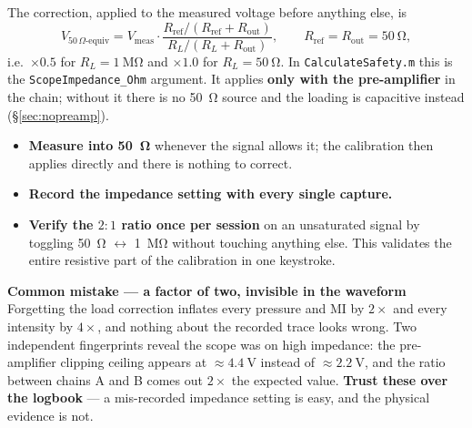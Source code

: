 \documentclass[11pt,a4paper]{article}
\newcommand{\good}[1]{\textcolor{green!45!black}{\textbf{#1}}}
\newcommand{\mistaketitle}[1]{\textcolor{orange!75!black}{\textbf{Common mistake --- #1}}\\[2pt]}
\begin{document}
The correction, applied to the measured voltage before anything else, is
\begin{equation}
  V_{50\,\Omega\text{-equiv}} = V_\mathrm{meas}\cdot
  \frac{R_\mathrm{ref}/(R_\mathrm{ref}+R_\mathrm{out})}{R_L/(R_L+R_\mathrm{out})},
  \qquad R_\mathrm{ref}=R_\mathrm{out}=\SI{50}{\ohm},
  \label{eq:loadcorr}
\end{equation}
i.e.\ $\times 0.5$ for $R_L=\SI{1}{\mega\ohm}$ and $\times 1.0$ for $R_L=\SI{50}{\ohm}$. In
\texttt{CalculateSafety.m} this is the \texttt{ScopeImpedance\_Ohm} argument. It applies
\textbf{only with the pre-amplifier} in the chain; without it there is no \SI{50}{\ohm} source and
the loading is capacitive instead (\S\ref{sec:nopreamp}).

\begin{description}[leftmargin=1.2em,style=nextline]
  \item[Rules.]\mbox{}
  \begin{itemize}
    \item \textbf{Measure into \SI{50}{\ohm}} whenever the signal allows it; the calibration then
      applies directly and there is nothing to correct.
    \item \textbf{Record the impedance setting with every single capture.}
    \item \textbf{Verify the $2:1$ ratio once per session} on an unsaturated signal by toggling
      \SI{50}{\ohm} $\leftrightarrow$ \SI{1}{\mega\ohm} without touching anything else. This
      validates the entire resistive part of the calibration in one keystroke.
  \end{itemize}
\end{description}

\begin{mistake}
\mistaketitle{a factor of two, invisible in the waveform}
Forgetting the load correction inflates every pressure and MI by $2\times$ and every intensity by
$4\times$, and nothing about the recorded trace looks wrong. Two independent fingerprints reveal the
scope was on high impedance: the pre-amplifier clipping ceiling appears at $\approx\SI{4.4}{\volt}$
instead of $\approx\SI{2.2}{\volt}$, and the ratio between chains A and B comes out $2\times$ the
expected value. \good{Trust these over the logbook} --- a mis-recorded impedance setting is easy, and
the physical evidence is not.
\end{mistake}
\end{document}
